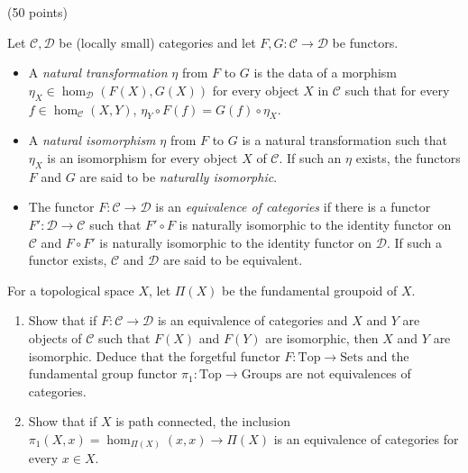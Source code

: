 \documentclass[12pt]{article}
\begin{document}
\begin{problem}{3}(50 points) 
    
    \begin{defn} Let $\mathcal{C}, \mathcal{D}$ be (locally small) categories and let $F, G: \mathcal{C} \to \mathcal{D}$ be functors. 
    \begin{itemize}

    \item A \emph{natural transformation} $\eta$ from $F$ to $G$ is the data of a morphism $\eta_X  \in \hom_{\mathcal{D}} (F(X), G(X))$ for every object $X$ in $\mathcal{C}$ such that for every $f \in \hom_\mathcal{C}(X,Y)$, $\eta_Y \circ F(f) = G(f) \circ \eta_X$. 

    \item A \emph{natural isomorphism} $\eta$ from $F$ to $G$ is a natural transformation such that $\eta_X$ is an isomorphism for every object $X$ of $\mathcal{C}$. If such an $\eta$ exists, the functors $F$ and $G$ are said to be \emph{naturally isomorphic}. 

    \item The functor $F:  \mathcal{C} \to \mathcal{D}$ is an \emph{equivalence of categories} if there is a functor $F':\mathcal{D} \to \mathcal{C}$ such that $F' \circ F$ is naturally isomorphic to the identity functor on $\mathcal{C}$ and $F \circ F'$ is naturally isomorphic to the identity functor on $\mathcal{D}$. If such a functor exists, $\mathcal{C}$ and $\mathcal{D}$ are said to be equivalent.
    \end{itemize}

    \end{defn}
    
    For a topological space $X$, let $\Pi(X)$ be the fundamental groupoid of $X$. 
    \begin{enumerate}
 
    \item Show that if $F: \mathcal{C} \to \mathcal{D}$ is an equivalence of categories and $X$ and $Y$ are objects of $\mathcal{C}$ such that $F(X)$ and $F(Y)$ are isomorphic, then $X$ and $Y$ are isomorphic. Deduce that the forgetful functor $F: \text{Top} \to \text{Sets}$ and the fundamental group functor $\pi_1: \text{Top} \to \text{Groups}$ are not equivalences of categories.
 
    \item Show that if $X$ is path connected, the inclusion $\pi_1(X,x) = \hom_{\Pi(X)}(x,x) \to \Pi(X)$ is an equivalence of categories for every $x \in X$.
 

\end{enumerate}
\end{problem}
\end{document}
